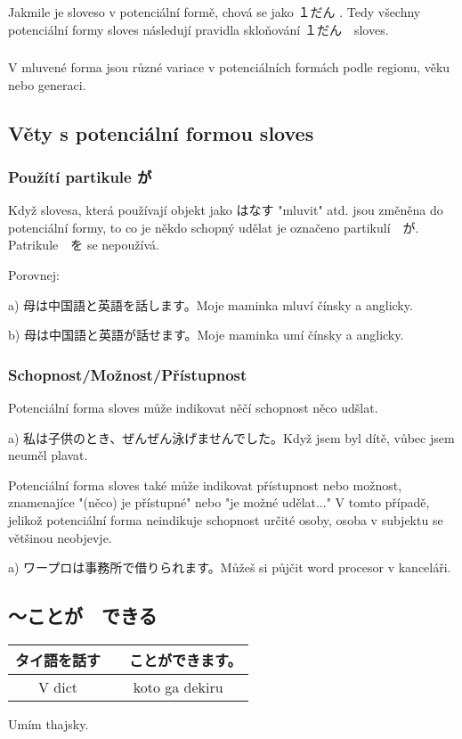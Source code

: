 \subsubsection{} Jakmile je sloveso v potenciální formě, chová se jako １だん	. Tedy všechny potenciální formy sloves následují pravidla skloňování 	１だん　sloves.
\subsubsection{} V mluvené forma jsou různé variace v potenciálních formách podle regionu, věku nebo generaci. 

\subsection{Věty s potenciální formou sloves}
\subsubsection{Použítí partikule が}

Když slovesa, která používají objekt jako はなす "mluvit" atd. jsou změněna do potenciální formy, to co je někdo schopný udělat je označeno partikulí　が. Patrikule　を se nepoužívá.

Porovnej:

a) 母は中国語と英語を話します。Moje maminka mluví čínsky a anglicky.

b) 母は中国語と英語が話せます。Moje maminka umí čínsky a anglicky.

\subsubsection{Schopnost/Možnost/Přístupnost}
Potenciální forma sloves může indikovat něčí schopnost něco udšlat.

a) 私は子供のとき、ぜんぜん泳げませんでした。Když jsem byl dítě, vůbec jsem neuměl plavat.

Potenciální forma sloves také může indikovat přístupnost nebo možnost, znamenajíce "(něco) je přístupné" nebo "je možné udělat..." V tomto případě, jelikož potenciální forma neindikuje schopnost určité osoby, osoba v subjektu se většinou neobjevje.

a) ワープロは事務所で借りられます。Můžeš si půjčit word procesor v kanceláři.


\subsection{〜ことが　できる}
\begin{tabular}{||c|c||}
\hline
タイ語を話す&　ことができます。\\
\hline
V dict & koto ga dekiru\\
\hline
\end{tabular}
Umím thajsky.

